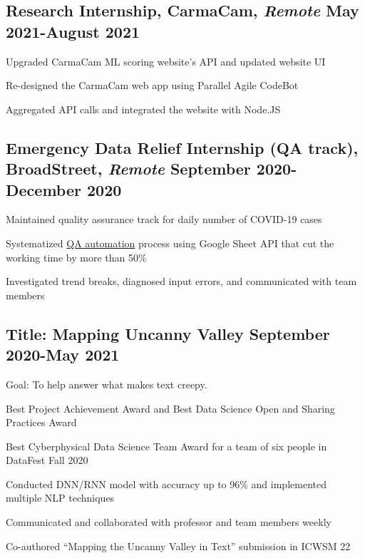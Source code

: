 \documentclass[11pt]{article}
\begin{document}
\subsection*{Research Internship{\normalfont, CarmaCam, \textit{Remote} \hfill May 2021-August 2021}}
\begin{compactitem}
    \item Upgraded CarmaCam ML scoring website's API and updated website UI
    \item Re-designed the CarmaCam web app using Parallel Agile\textregistered\xspace CodeBot\textregistered
    \item Aggregated API calls and integrated the website with Node.JS
\end{compactitem}
\vspace{0.1in}

\subsection*{Emergency Data Relief Internship (QA track){\normalfont, BroadStreet, \textit{Remote} \hfill September 2020-December 2020}}
\begin{compactitem}
    \item Maintained quality assurance track for daily number of COVID-19 cases
    \item Systematized \href{https://github.com/Anthonyive/broadstreet-qa-automation.git}{QA automation} 
        process using Google Sheet API that cut the working time by more than 
        50\%
    \item Investigated trend breaks, diagnosed input errors, and communicated 
        with team members
\end{compactitem}
\vspace{0.1in}

\subsection*{Title: Mapping Uncanny Valley \hfill {\normalfont September 
2020-May 2021}}
\noindent
\href{https://github.com/Anthonyive/Research-Mapping-Uncanny-Valley.git}{} Goal: To help answer what makes text creepy.
\begin{compactitem}
    \item Best Project Achievement Award and Best Data Science Open and 
        Sharing Practices Award
    \item Best Cyberphysical Data Science Team Award for a team of six people 
        in DataFest Fall 2020
    \item Conducted DNN/RNN model with accuracy up to 96\% and implemented 
        multiple NLP techniques
    \item Communicated and collaborated with professor and team members weekly
    \item Co-authored ``Mapping the Uncanny Valley in Text'' submission in 
        ICWSM 22
\end{compactitem}
\vspace{0.1in}
\end{document}
